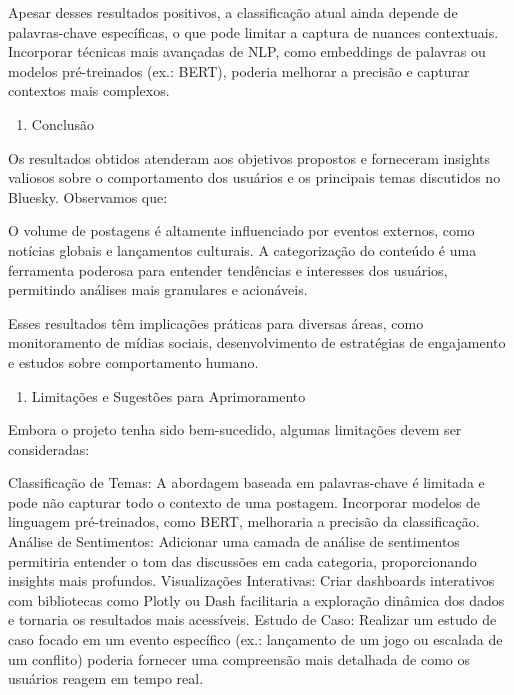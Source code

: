 \documentclass[
  letterpaper,
  DIV=11,
  numbers=noendperiod]{scrartcl}
\providecommand{\tightlist}{%
  \setlength{\itemsep}{0pt}\setlength{\parskip}{0pt}}\usepackage{longtable,booktabs,array}
\begin{document}
Apesar desses resultados positivos, a classificação atual ainda depende
de palavras-chave específicas, o que pode limitar a captura de nuances
contextuais. Incorporar técnicas mais avançadas de NLP, como embeddings
de palavras ou modelos pré-treinados (ex.: BERT), poderia melhorar a
precisão e capturar contextos mais complexos.

\begin{enumerate}
\def\labelenumi{\arabic{enumi}.}
\setcounter{enumi}{2}
\tightlist
\item
  Conclusão
\end{enumerate}

Os resultados obtidos atenderam aos objetivos propostos e forneceram
insights valiosos sobre o comportamento dos usuários e os principais
temas discutidos no Bluesky. Observamos que:

\begin{VerbatimWithBreaks}
O volume de postagens é altamente influenciado por eventos externos, como notícias globais e lançamentos culturais.
A categorização do conteúdo é uma ferramenta poderosa para entender tendências e interesses dos usuários, permitindo análises mais granulares e acionáveis.
 
\end{VerbatimWithBreaks}

Esses resultados têm implicações práticas para diversas áreas, como
monitoramento de mídias sociais, desenvolvimento de estratégias de
engajamento e estudos sobre comportamento humano.

\begin{enumerate}
\def\labelenumi{\arabic{enumi}.}
\setcounter{enumi}{3}
\tightlist
\item
  Limitações e Sugestões para Aprimoramento
\end{enumerate}

Embora o projeto tenha sido bem-sucedido, algumas limitações devem ser
consideradas:

\begin{VerbatimWithBreaks}
Classificação de Temas:  A abordagem baseada em palavras-chave é limitada e pode não capturar todo o contexto de uma postagem. Incorporar modelos de linguagem pré-treinados, como BERT, melhoraria a precisão da classificação.
Análise de Sentimentos:  Adicionar uma camada de análise de sentimentos permitiria entender o tom das discussões em cada categoria, proporcionando insights mais profundos.
Visualizações Interativas:  Criar dashboards interativos com bibliotecas como Plotly ou Dash facilitaria a exploração dinâmica dos dados e tornaria os resultados mais acessíveis.
Estudo de Caso:  Realizar um estudo de caso focado em um evento específico (ex.: lançamento de um jogo ou escalada de um conflito) poderia fornecer uma compreensão mais detalhada de como os usuários reagem em tempo real.
 
\end{VerbatimWithBreaks}
\end{document}
